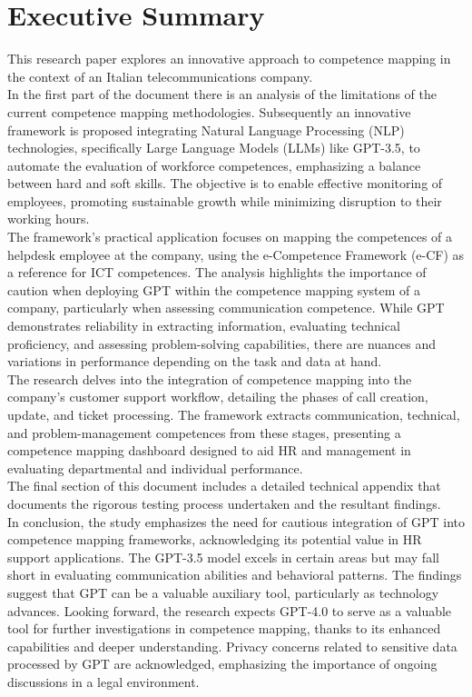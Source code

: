\documentclass{report}
\begin{document}
\parindent=0pt
\sloppy

\chapter*{Executive Summary}
This research paper explores an innovative approach to competence mapping in the context of an Italian telecommunications company. \\

In the first part of the document there is an analysis of the limitations of the current competence mapping methodologies. Subsequently an innovative framework is proposed integrating Natural Language Processing (NLP) technologies, specifically Large Language Models (LLMs) like GPT-3.5, to automate the evaluation of workforce competences, emphasizing a balance between hard and soft skills. The objective is to enable effective monitoring of employees, promoting sustainable growth while minimizing disruption to their working hours.\\

The framework's practical application focuses on mapping the competences of a helpdesk employee at the company, using the e-Competence Framework (e-CF) as a reference for ICT competences. The analysis highlights the importance of caution when deploying GPT within the competence mapping system of a company, particularly when assessing communication competence. While GPT demonstrates reliability in extracting information, evaluating technical proficiency, and assessing problem-solving capabilities, there are nuances and variations in performance depending on the task and data at hand.\\

The research delves into the integration of competence mapping into the company's customer support workflow, detailing the phases of call creation, update, and ticket processing. The framework extracts communication, technical, and problem-management competences from these stages, presenting a competence mapping dashboard designed to aid HR and management in evaluating departmental and individual performance.\\

The final section of this document includes a detailed technical appendix that documents the rigorous testing process undertaken and the resultant findings.\\

In conclusion, the study emphasizes the need for cautious integration of GPT into competence mapping frameworks, acknowledging its potential value in HR support applications. The GPT-3.5 model excels in certain areas but may fall short in evaluating communication abilities and behavioral patterns. The findings suggest that GPT can be a valuable auxiliary tool, particularly as technology advances. Looking forward, the research expects GPT-4.0 to serve as a valuable tool for further investigations in competence mapping, thanks to its enhanced capabilities and deeper understanding. Privacy concerns related to sensitive data processed by GPT are acknowledged, emphasizing the importance of ongoing discussions in a legal environment.
\end{document}

